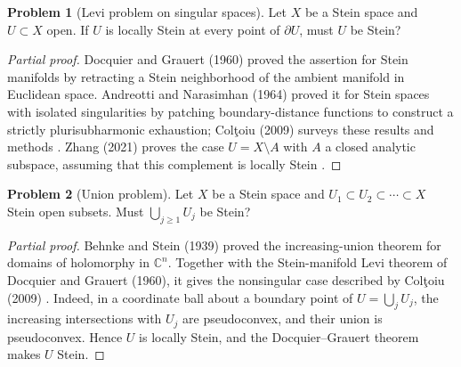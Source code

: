 \documentclass[11pt,reqno]{amsart}
\theoremstyle{definition}
\newtheorem{problem}{Problem}[section]
\theoremstyle{remark}
\begin{document}
\begin{problem}[Levi problem on singular spaces]\label{b95-4-1-1}\label{FS-3.8}
Let $X$ be a Stein space and $U\subset X$ open. If $U$ is locally Stein at every point of $\partial U$, must $U$ be Stein?
\end{problem}
\begin{proof}[Partial proof]
Docquier and Grauert (1960) proved the assertion for Stein manifolds by retracting a Stein neighborhood of the ambient manifold in Euclidean space. Andreotti and Narasimhan (1964) proved it for Stein spaces with isolated singularities by patching boundary-distance functions to construct a strictly plurisubharmonic exhaustion; Col\c toiu (2009) surveys these results and methods \cite{FS-Coltoiu}. Zhang (2021) proves the case $U=X\setminus A$ with $A$ a closed analytic subspace, assuming that this complement is locally Stein \cite{B95-Zhang}.
\end{proof}

\begin{problem}[Union problem]\label{b95-4-3-1}
Let $X$ be a Stein space and $U_1\subset U_2\subset\cdots\subset X$ Stein open subsets. Must $\bigcup_{j\geq1}U_j$ be Stein?
\end{problem}
\begin{proof}[Partial proof]
Behnke and Stein (1939) proved the increasing-union theorem for domains of holomorphy in $\mathbb C^n$. Together with the Stein-manifold Levi theorem of Docquier and Grauert (1960), it gives the nonsingular case described by Col\c toiu (2009) \cite{FS-Coltoiu}. Indeed, in a coordinate ball about a boundary point of $U=\bigcup_jU_j$, the increasing intersections with $U_j$ are pseudoconvex, and their union is pseudoconvex. Hence $U$ is locally Stein, and the Docquier--Grauert theorem makes $U$ Stein.
\end{proof}
\end{document}
